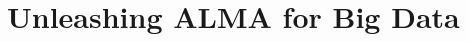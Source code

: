 \documentclass[12pt,letterpaper]{article}
\newcommand{\required}[1]{\section*{\hfill #1 \hfill}}               %
\begin{document}
\required{Unleashing ALMA for Big Data}



\clearpage \setcounter{page}{1}







 




\end{document}
